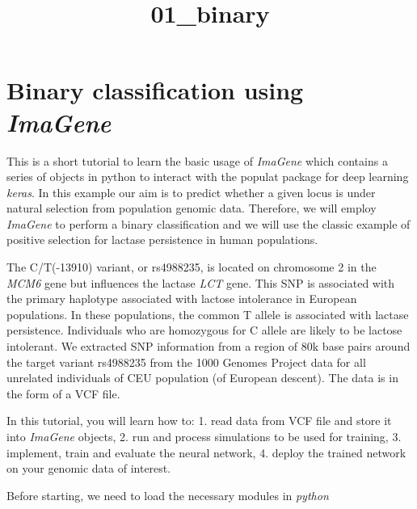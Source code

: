 \documentclass[11pt]{article}
\title{01\_binary}
\begin{document}
    
    
    \maketitle
    
    

    
    \hypertarget{binary-classification-using-imagene}{%
\section{\texorpdfstring{Binary classification using
\emph{ImaGene}}{Binary classification using ImaGene}}\label{binary-classification-using-imagene}}

    This is a short tutorial to learn the basic usage of \emph{ImaGene}
which contains a series of objects in python to interact with the
populat package for deep learning \emph{keras}. In this example our aim
is to predict whether a given locus is under natural selection from
population genomic data. Therefore, we will employ \emph{ImaGene} to
perform a binary classification and we will use the classic example of
positive selection for lactase persistence in human populations.

The C/T(-13910) variant, or rs4988235, is located on chromosome 2 in the
\emph{MCM6} gene but influences the lactase \emph{LCT} gene. This SNP is
associated with the primary haplotype associated with lactose
intolerance in European populations. In these populations, the common T
allele is associated with lactase persistence. Individuals who are
homozygous for C allele are likely to be lactose intolerant. We
extracted SNP information from a region of 80k base pairs around the
target variant rs4988235 from the 1000 Genomes Project data for all
unrelated individuals of CEU population (of European descent). The data
is in the form of a VCF file.

In this tutorial, you will learn how to: 1. read data from VCF file and
store it into \emph{ImaGene} objects, 2. run and process simulations to
be used for training, 3. implement, train and evaluate the neural
network, 4. deploy the trained network on your genomic data of interest.

    Before starting, we need to load the necessary modules in \emph{python}
\end{document}
